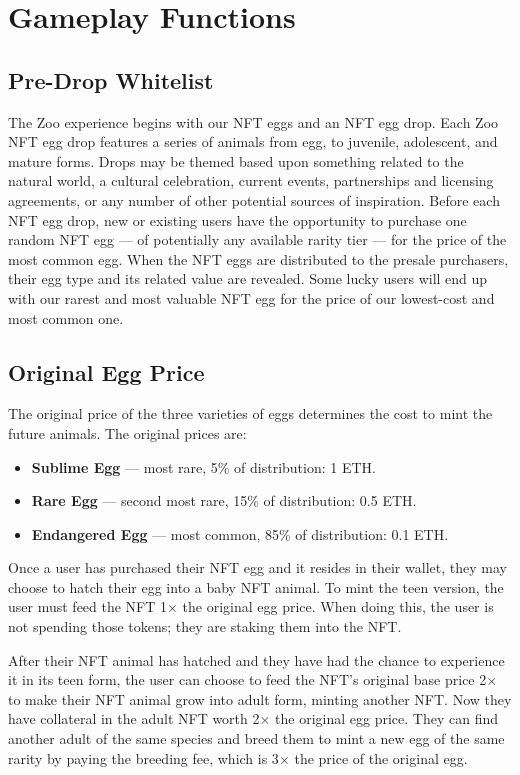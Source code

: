 \section{Gameplay Functions}
\label{sec:gameplay-fn}

\subsection{Pre-Drop Whitelist}

The Zoo experience begins with our NFT eggs and an NFT egg drop. Each Zoo NFT egg drop features a series of animals from egg, to juvenile, adolescent, and mature forms. Drops may be themed based upon something related to the natural world, a cultural celebration, current events, partnerships and licensing agreements, or any number of other potential sources of inspiration. Before each NFT egg drop, new or existing users have the opportunity to purchase one random NFT egg --- of potentially any available rarity tier --- for the price of the most common egg. When the NFT eggs are distributed to the presale purchasers, their egg type and its related value are revealed. Some lucky users will end up with our rarest and most valuable NFT egg for the price of our lowest-cost and most common one.

\subsection{Original Egg Price}

The original price of the three varieties of eggs determines the cost to mint the future animals. The original prices are:
\begin{itemize}
  \item \textbf{Sublime Egg} --- most rare, 5\% of distribution: 1 ETH.
  \item \textbf{Rare Egg} --- second most rare, 15\% of distribution: 0.5 ETH.
  \item \textbf{Endangered Egg} --- most common, 85\% of distribution: 0.1 ETH.
\end{itemize}

Once a user has purchased their NFT egg and it resides in their wallet, they may choose to hatch their egg into a baby NFT animal. To mint the teen version, the user must feed the NFT 1$\times$ the original egg price. When doing this, the user is not spending those tokens; they are staking them into the NFT.

After their NFT animal has hatched and they have had the chance to experience it in its teen form, the user can choose to feed the NFT's original base price 2$\times$ to make their NFT animal grow into adult form, minting another NFT. Now they have collateral in the adult NFT worth 2$\times$ the original egg price. They can find another adult of the same species and breed them to mint a new egg of the same rarity by paying the breeding fee, which is 3$\times$ the price of the original egg.

